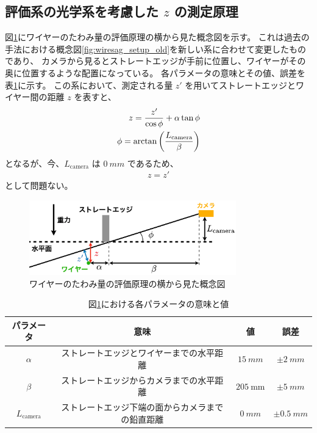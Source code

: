 \documentclass[../../main.tex]{subfiles}
\begin{document}
\subsection{評価系の光学系を考慮した $z$ の測定原理}
図\ref{fig:wiresag_concept_yoko}にワイヤーのたわみ量の評価原理の横から見た概念図を示す。
これは過去の手法における概念図\ref{fig:wiresag_setup_old}を新しい系に合わせて変更したものであり、
カメラから見るとストレートエッジが手前に位置し、ワイヤーがその奥に位置するような配置になっている。
各パラメータの意味とその値、誤差を表\ref{tab:wiresag_concept_yoko_params}に示す。
この系において、測定される量 $z'$ を用いてストレートエッジとワイヤー間の距離 $z$ を表すと、
\begin{align}
    z = \dfrac{z'}{\cos\phi} + \alpha\tan\phi \\
    \phi = \arctan\qty(\dfrac{L_{\mathrm{camera}}}{\beta})
\end{align}
となるが、今、$L_{\mathrm{camera}}$ は $\SI{0}{mm}$ であるため、
\begin{align}
    z = z'
\end{align}
として問題ない。

\begin{figure}[H]
    \centering
    \includegraphics[width=0.8\textwidth]{wiresag/wiresag_concept_yoko.pdf}
    \caption{ワイヤーのたわみ量の評価原理の横から見た概念図}
    \label{fig:wiresag_concept_yoko}
\end{figure}
\begin{table}[H]
    \centering
    \caption{図\ref{fig:wiresag_concept_yoko}における各パラメータの意味と値}
    \begin{tabular}{cccc}
        \hline
        パラメータ & 意味 & 値 & 誤差 \\
        \hline\hline
        $\alpha$ & ストレートエッジとワイヤーまでの水平距離 & $\SI{15}{mm}$ & $\pm\SI{2}{mm}$ \\
        $\beta$ & ストレートエッジからカメラまでの水平距離 & $\SI{205}{\mm}$ & $\pm\SI{5}{mm}$ \\
        $L_{\mathrm{camera}}$ & ストレートエッジ下端の面からカメラまでの鉛直距離 & $\SI{0}{mm}$ & $\pm\SI{0.5}{mm}$ \\
        \hline
    \end{tabular}
    \label{tab:wiresag_concept_yoko_params}
\end{table}
\end{document}
